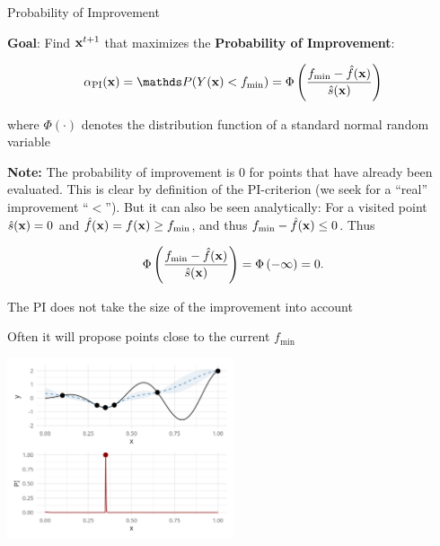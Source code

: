 \documentclass[11pt,compress,t,notes=noshow, xcolor=table]{beamer}
\begin{document}
\begin{vbframe}{Probability of Improvement}

\textbf{Goal}: Find $\mathbf{x}^{t+1}$ that maximizes the \textbf{Probability of Improvement}:

$$
  \alpha_{\text{PI}}(\xv) = \P(Y(\xv) < f_{\min}) = \Phi\left(\frac{f_{\min} - \hat{f}(\xv)}{\hat{s}(\xv)}\right)
$$

where $\Phi(\cdot)$ denotes the distribution function of a standard normal random variable

\vfill

\begin{footnotesize}
\textbf{Note:} The probability of improvement is $0$ for points that have already been evaluated. This is clear by definition of the PI-criterion (we seek for a \enquote{real} improvement \enquote{$<$}). But it can also be seen analytically: For a visited point $\hat{s}(\mathbf{x}) = 0$ and $\hat{f}(\mathbf{x}) = f(\mathbf{x}) \ge f_{\min}$, and thus $f_{\min} - \hat{f}(\mathbf{x}) \le 0$. Thus

$$
  \Phi\left(\frac{f_{\min} - \hat{f}(\mathbf{x})}{\hat{s}(\mathbf{x})}\right) = \Phi\left(- \infty\right) = 0.
$$

\end{footnotesize}

\framebreak

The PI does not take the size of the improvement into account

Often it will propose points close to the current $f_{\min}$

\begin{center}
  \includegraphics[width = 0.5\textwidth]{figure_man/bayesian_loop_pi_0.png}
\end{center}

\end{vbframe}
\end{document}
